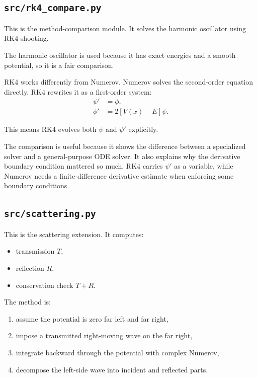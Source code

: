 \documentclass[11pt]{article}
\begin{document}
    \subsection{\texttt{src/rk4\_compare.py}}

    This is the method-comparison module. It solves the harmonic oscillator using RK4 shooting.

    The harmonic oscillator is used because it has exact energies and a smooth potential, so it is a fair comparison.

    RK4 works differently from Numerov. Numerov solves the second-order equation directly. RK4 rewrites it as a first-order system:
    \begin{align}
        \psi' &= \phi, \\
        \phi' &= 2[V(x)-E]\psi.
    \end{align}

    This means RK4 evolves both $\psi$ and $\psi'$ explicitly.

    The comparison is useful because it shows the difference between a specialized solver and a general-purpose ODE solver. It also explains why the derivative boundary condition mattered so much. RK4 carries $\psi'$ as a variable, while Numerov needs a finite-difference derivative estimate when enforcing some boundary conditions.

    \subsection{\texttt{src/scattering.py}}

    This is the scattering extension. It computes:
    \begin{itemize}
        \item transmission $T$,
        \item reflection $R$,
        \item conservation check $T+R$.
    \end{itemize}

    The method is:
    \begin{enumerate}
        \item assume the potential is zero far left and far right,
        \item impose a transmitted right-moving wave on the far right,
        \item integrate backward through the potential with complex Numerov,
        \item decompose the left-side wave into incident and reflected parts.
    \end{enumerate}
\end{document}
